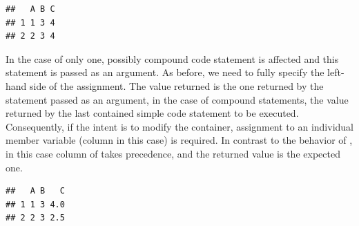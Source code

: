 \documentclass[krantz2]{krantz}\usepackage{knitr}
\begin{document}
\begin{explainbox}
\begin{knitrout}\footnotesize
{}\color{fgcolor}\begin{kframe}
\begin{alltt}
\hlopt{$} \hlkwb{<-} 
\end{alltt}


{\ttfamily\noindent\itshape\color{messagecolor}{\#\# The following object is masked \_by\_ .GlobalEnv:\\\#\# \\\#\#\ \ \ \  A}}\begin{alltt}
\hlopt{$} \hlkwb{<-}  \hlopt{+}  \hlopt{/} 
 \hlstd{)}
\end{alltt}
\begin{verbatim}
##   A B C
## 1 1 3 4
## 2 2 3 4
\end{verbatim}
\end{kframe}
\end{knitrout}

In the case of  only one, possibly compound code statement is affected and this statement is passed as an argument. As before, we need to fully specify the left-hand side of the assignment. The value returned is the one returned by the statement passed as an argument, in the case of compound statements, the value returned by the last contained simple code statement to be executed. Consequently, if the intent is to modify the container, assignment to an individual member variable (column in this case) is required. In contrast to the behavior of , in this case column  of  takes precedence, and the returned value is the expected one.

\begin{knitrout}\footnotesize
{}\color{fgcolor}\begin{kframe}
\begin{alltt}
\hlopt{$} \hlkwb{<-} 
\hlopt{$} \hlkwb{<-}  \hlopt{+}  \hlopt{/} 
 \hlstd{)}
\end{alltt}
\begin{verbatim}
##   A B   C
## 1 1 3 4.0
## 2 2 3 2.5
\end{verbatim}
\end{kframe}
\end{knitrout}


\end{explainbox}
\end{document}
